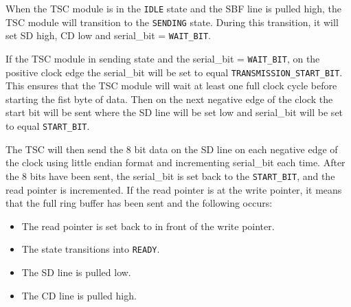 When the TSC module is in the \texttt{IDLE} state and the SBF line is pulled high, the TSC module will transition to the \texttt{SENDING} state.
During this transition, it will set SD high, CD low and serial\_bit = \texttt{WAIT\_BIT}.

If the TSC module in sending state and the serial\_bit = \texttt{WAIT\_BIT}, on the positive clock edge the serial\_bit will be set to equal \texttt{TRANSMISSION\_START\_BIT}.
This ensures that the TSC module will wait at least one full clock cycle before starting the fist byte of data.
Then on the next negative edge of the clock the start bit will be sent where the SD line will be set low and serial\_bit will be set to equal \texttt{START\_BIT}.

The TSC will then send the 8 bit data on the SD line on each negative edge of the clock using little endian format and incrementing serial\_bit each time.
After the 8 bits have been sent, the serial\_bit is set back to the \texttt{START\_BIT}, and the read pointer is incremented.
If the read pointer is at the write pointer, it means that the full ring buffer has been sent and the following occurs:

\begin{itemize}
    \item The read pointer is set back to in front of the write pointer.
    \item The state transitions into \texttt{READY}.
    \item The SD line is pulled low.
    \item The CD line is pulled high.
\end{itemize}



















